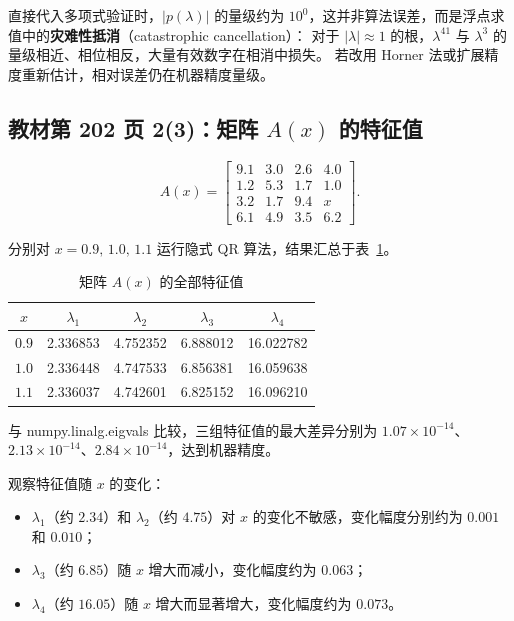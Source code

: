 \documentclass[10pt, a4paper]{article}
\begin{document}
直接代入多项式验证时，$|p(\lambda)|$ 的量级约为 $10^0$，这并非算法误差，而是浮点求值中的\textbf{灾难性抵消}（catastrophic cancellation）：
对于 $|\lambda| \approx 1$ 的根，$\lambda^{41}$ 与 $\lambda^3$ 的量级相近、相位相反，大量有效数字在相消中损失。
若改用 Horner 法或扩展精度重新估计，相对误差仍在机器精度量级。

\subsection{教材第 202 页 2(3)：矩阵 $A(x)$ 的特征值}

\[
A(x) = \begin{bmatrix}
9.1 & 3.0 & 2.6 & 4.0 \\
1.2 & 5.3 & 1.7 & 1.0 \\
3.2 & 1.7 & 9.4 & x \\
6.1 & 4.9 & 3.5 & 6.2
\end{bmatrix}.
\]

分别对 $x = 0.9,\,1.0,\,1.1$ 运行隐式 QR 算法，结果汇总于表~\ref{tab:Ax}。

\begin{table}[H]
    \centering
    \caption{矩阵 $A(x)$ 的全部特征值}
    \label{tab:Ax}
    \begin{tabular}{c|cccc}
        \toprule
        $x$ & $\lambda_1$ & $\lambda_2$ & $\lambda_3$ & $\lambda_4$ \\
        \midrule
        $0.9$ & 2.336853 & 4.752352 & 6.888012 & 16.022782 \\
        $1.0$ & 2.336448 & 4.747533 & 6.856381 & 16.059638 \\
        $1.1$ & 2.336037 & 4.742601 & 6.825152 & 16.096210 \\
        \bottomrule
    \end{tabular}
\end{table}

与 numpy.linalg.eigvals 比较，三组特征值的最大差异分别为 $1.07\times10^{-14}$、$2.13\times10^{-14}$、$2.84\times10^{-14}$，达到机器精度。

观察特征值随 $x$ 的变化：
\begin{itemize}
    \item $\lambda_1$（约 $2.34$）和 $\lambda_2$（约 $4.75$）对 $x$ 的变化不敏感，变化幅度分别约为 $0.001$ 和 $0.010$；
    \item $\lambda_3$（约 $6.85$）随 $x$ 增大而减小，变化幅度约为 $0.063$；
    \item $\lambda_4$（约 $16.05$）随 $x$ 增大而显著增大，变化幅度约为 $0.073$。
\end{itemize}
\end{document}
